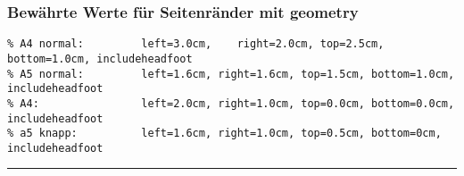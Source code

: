 \subsubsection*{Bewährte Werte für Seitenränder mit geometry}
\negAbstand
\begin{lstlisting}
% A4 normal:		 left=3.0cm,	right=2.0cm, top=2.5cm, bottom=1.0cm, includeheadfoot 
% A5 normal:		 left=1.6cm, right=1.6cm, top=1.5cm, bottom=1.0cm, includeheadfoot
% A4: 				 left=2.0cm, right=1.0cm, top=0.0cm, bottom=0.0cm, includeheadfoot
% a5 knapp:			 left=1.6cm, right=1.0cm, top=0.5cm, bottom=0cm, includeheadfoot
\end{lstlisting}


\hrule \vspace{0.5\baselineskip}
